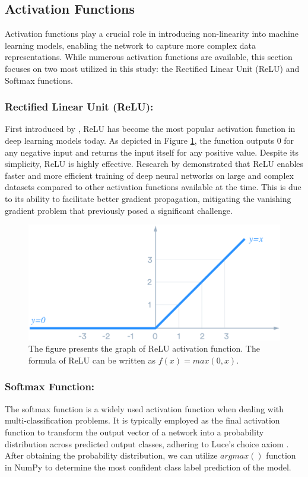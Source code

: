 \documentclass{l4proj}
\begin{document}
\subsection{Activation Functions}
Activation functions play a crucial role in introducing non-linearity into machine learning models, enabling the network to capture more complex data representations. While numerous activation functions are available, this section focuses on two most utilized in this study: the Rectified Linear Unit (ReLU) and Softmax functions.

\subsubsection{Rectified Linear Unit (ReLU):}
First introduced by \cite{cognitron_self-organizing_multilayered_nn}, ReLU has become the most popular activation function in deep learning models today. As depicted in Figure \ref{fig:ReLU}, the function outputs 0 for any negative input and returns the input itself for any positive value. Despite its simplicity, ReLU is highly effective. Research by \cite{deep_sparse_rectifier_nn} demonstrated that ReLU enables faster and more efficient training of deep neural networks on large and complex datasets compared to other activation functions available at the time. This is due to its ability to facilitate better gradient propagation, mitigating the vanishing gradient problem that previously posed a significant challenge.

\begin{figure}[h]
    \centering
    \includegraphics[width=0.5\linewidth]{images/ReLU.png}
    \caption{The figure presents the graph of ReLU activation function. The formula of ReLU can be written as $f(x) = max(0,x)$.}
    \label{fig:ReLU}
\end{figure}

\subsubsection{Softmax Function:}
The softmax function is a widely used activation function when dealing with multi-classification problems. It is typically employed as the final activation function to transform the output vector of a network into a probability distribution across predicted output classes, adhering to Luce's choice axiom \citep{luce_axiom}. After obtaining the probability distribution, we can utilize $argmax()$ function in NumPy to determine the most confident class label prediction of the model.
\end{document}

